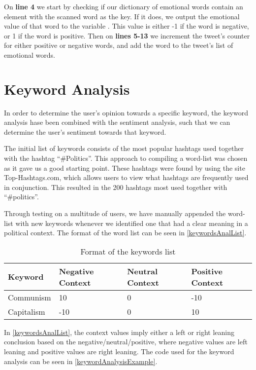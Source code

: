 On \textbf{line 4} we start by checking if our dictionary of emotional words
contain an element with the scanned word as the key. If it does, we output the
emotional value of that word to the variable . This value is
either -1 if the word is negative, or 1 if the word is positive. Then on
\textbf{lines 5-13} we increment the tweet's counter for either positive or
negative words, and add the word to the tweet's list of emotional words.

\section{Keyword Analysis}
In order to determine the user's opinion towards a specific keyword, the keyword
analysis hase been combined with the sentiment analysis, such that we can
determine the user's sentiment towards that keyword.

The initial list of keywords consists of the most popular hashtags used together
with the hashtag ``\#Politics''. This approach to compiling a word-list was
chosen as it gave us a good starting point. These hashtags were found by using
the site Top-Hashtags.com, which allows users to view what hashtags are
frequently used in conjunction. This resulted in the 200 hashtags most used
together with ``\#politics''.\nl

Through testing on a multitude of users, we have manually appended the word-list
with new keywords whenever we identified one that had a clear meaning in a
political context. The format of the word list can be seen in
\autoref{keywordsAnalList}.\\

\begin{table}[H]
\begin{tabular}{|l|l|l|l|}
\textbf{Keyword} & \textbf{Negative Context} & \textbf{Neutral Context} & \textbf{Positive Context} \\\hline
Communism & 10 & 0 & -10 \\\hline
Capitalism & -10 & 0 & 10 \\\hline
\end{tabular}
\caption{Format of the keywords list}
\label{keywordsAnalList}
\end{table} 

In \autoref{keywordsAnalList}, the context values imply either a left or
right leaning conclusion based on the negative/neutral/positive, where negative
values are left leaning and positive values are right leaning. The code used for
the keyword analysis can be seen in \autoref{keywordAnalysisExample}.\\

